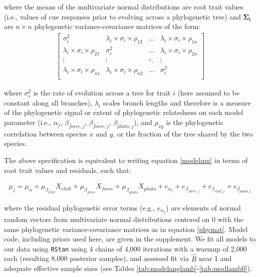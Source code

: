 \documentclass[11pt]{article}
\begin{document}
\noindent where the means of the multivariate normal distributions are root trait values (i.e., values of cue responses prior to evolving across a phylogenetic tree) and $\boldsymbol{\Sigma_i}$ %
are $n \times n$ phylogenetic variance-covariance matrices of the form: \\ 
\begin{align}
  \label{phymat}
\begin{bmatrix}
  \sigma^2_i & \lambda_i \times \sigma_{i} \times \rho_{12} & \ldots & \lambda_i \times \sigma_{i} \times \rho_{1n} \\
  \lambda_i \times \sigma_i \times \rho_{21} & \sigma^2_i & \ldots & \lambda_i \times \sigma_{i} \times \rho_{2n} \\
  \vdots & \vdots & \ddots & \vdots \\
  \lambda_i \times \sigma_i \times \rho_{n1} & \lambda_i \times \sigma_i \times \rho_{n2} & \ldots & \sigma^2_i \\
\end{bmatrix}
\end{align}

\noindent where $\sigma_i^2$ is the rate of evolution across a tree for trait $i$ (here assumed to be constant along all branches), $\lambda_i$ scales branch lengths and therefore is a measure of the phylogenetic signal or extent of phylogenetic relatedness on each model parameter (i.e., $\alpha_{j}$, $\beta_{force,j}$, $\beta_{force,j}$, $\beta_{photo,j}$), and $\rho_{xy}$ is the phylogenetic correlation between species $x$ and $y$, or the fraction of the tree shared by the two species.

The above specification is equivalent to writing equation \ref{modelmu} in terms of root trait values and residuals, such that:

\begin{align}
  \label{eqfive}
  \mu_j = \mu_\alpha + \mu_{\beta_{chill}} X_{chill} + \mu_{\beta_{force}} X_{force} + \mu_{\beta_{photo}} X_{photo} + e_{\alpha_{j}} + e_{\beta_{force,j}} + e_{\beta_{chill,j}} + e_{\beta_{photo,j}}
\end{align}

\noindent where the residual phylogenetic error terms (e.g., $e_{\alpha_{j}}$) are elements of normal random vectors from multivariate normal distributions centered on $0$ with the same phylogenetic variance-covariance matrices as in equation \ref{phymat}. Model code, including priors used here, are given in the supplement. We fit all models to our data using \verb|RStan| using 4 chains of 4,000 iterations with a warmup of 2,000 each (resulting 8,000 posterior samples), and assessed fit via $\hat{R}$ near 1 and adequate effective sample sizes (see Tables \ref{tab:modelanglamb}-\ref{tab:modlamb0}). 
\end{document}
